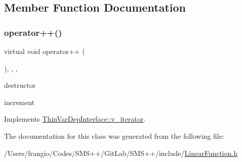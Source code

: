 \subsection{Member Function Documentation}
\mbox{\label{class_s_m_spp__di__unipi__it_1_1_linear_function_1_1v__iterator_af860fe44bc54c0cbca8e733ab0e954e0}} 
\subsubsection{\texorpdfstring{operator++()}{operator++()}}
{\footnotesize\ttfamily virtual void operator++ (\begin{DoxyParamCaption}\item[{void}]{ }\end{DoxyParamCaption})\hspace{0.3cm}{\ttfamily [inline]}, {\ttfamily [final]}, {\ttfamily [override]}, {\ttfamily [virtual]}}



destructor 

increment 

Implements \mbox{\hyperlink{group___thin_var_dep_interface___c_l_a_s_s_e_s_ga79fc9d17094dc591d6b48bc296028d51}{Thin\+Var\+Dep\+Interface\+::v\+\_\+iterator}}.



The documentation for this class was generated from the following file\+:\begin{DoxyCompactItemize}
\item 
/\+Users/frangio/\+Codes/\+S\+M\+S++/\+Git\+Lab/\+S\+M\+S++/include/\mbox{\hyperlink{_linear_function_8h}{Linear\+Function.\+h}}\end{DoxyCompactItemize}
